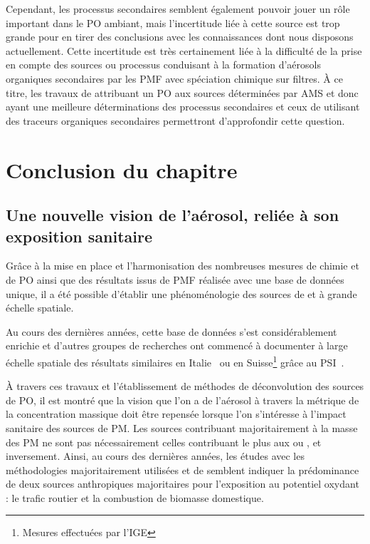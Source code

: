 Cependant, les processus secondaires semblent également pouvoir jouer un rôle important
dans le PO ambiant, mais l'incertitude liée à cette source est trop grande pour en tirer
des conclusions avec les connaissances dont nous disposons actuellement. Cette
incertitude est très certainement liée à la difficulté de la prise en compte des sources
ou processus conduisant à la formation d'aérosols organiques secondaires par les PMF avec
spéciation chimique sur filtres.
À ce titre, les travaux de \cite{daellenbachSourcessubmitted} attribuant un PO aux sources
déterminées par AMS et donc ayant une meilleure déterminations des processus secondaires et
ceux de \cite{borlazaUrbaninprep.} utilisant des traceurs organiques secondaires
permettront d'approfondir cette question.

\section{Conclusion du chapitre}%
\label{sec:conclusion_chap4}

\subsection{Une nouvelle vision de l'aérosol, reliée à son exposition sanitaire}%
\label{sub:une_nouvelle_vision_de_l_aérosol_plus_proche_de_l_impact_sanitaire}

Grâce à la mise en place et l'harmonisation des nombreuses mesures de chimie et de PO
ainsi que des résultats issus de PMF réalisée avec une base de données unique, il a été possible
d'établir une phénoménologie des sources de \POAA{} et \PODTT{} à grande échelle spatiale.

Au cours des dernières années, cette base de données s'est considérablement enrichie et
d'autres groupes de recherches ont commencé à documenter à large échelle spatiale des
résultats similaires en Italie~\autocite{pietrograndeReview2019} ou en
Suisse\footnote{Mesures effectuées par l'IGE} grâce au
PSI~\autocite{daellenbachSourcessubmitted}. 

À travers ces travaux et l'établissement de méthodes de déconvolution des sources de PO, il
est montré que la vision que l'on a de l'aérosol à travers la métrique de la
concentration massique doit être repensée lorsque l'on s'intéresse à l'impact sanitaire
des sources de PM. Les sources contribuant majoritairement à la masse des PM ne sont pas
nécessairement celles contribuant le plus aux \POAA{} ou \PODTT, et inversement.
Ainsi, au cours des dernières années, les études avec les méthodologies majoritairement utilisées \POAA{} et \PODTT{} de
\cite{vermaReactive2014,batesReactive2015,fangOxidative2016,weberApportionment2018,cesariSource2019,daellenbachSourcessubmitted,weberSourceinprep.}
semblent indiquer la prédominance de deux sources anthropiques majoritaires pour l'exposition
au potentiel oxydant : le trafic routier et la combustion de biomasse domestique.

